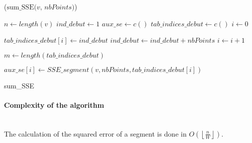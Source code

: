 


\begin{algorithm}[h]
\DontPrintSemicolon
{}

\Begin($\text{sum\_SSE} {(} v, \, nbPoints{)}$)
{
  $n \leftarrow length(v)$\;
	$ind\_debut \leftarrow 1$\;
	$aux\_se \leftarrow c()$\;
	$tab\_indices\_debut \leftarrow c()$\;
	$i \leftarrow 0$\;
	
	{
		$tab\_indices\_debut[i] \leftarrow ind\_debut$\;
		$ind\_debut \leftarrow ind\_debut + nbPoints$\;
		$i \leftarrow i + 1$\;
	}
	
	$m \leftarrow length(tab\_indices\_debut)$\;
	
  {
		$aux\_se[i] \leftarrow SSE\_segment(v, nbPoints, tab\_indices\_debut[i]) $\;
  }


}
\caption{sum\_SSE}
\label{algo2}
\end{algorithm}
 
 

\paragraph{Complexity of the algorithm}\\
The calculation of the squared error of a segment is done in $ O(\left \lfloor
\frac{n}{W} \right \rfloor) $.

